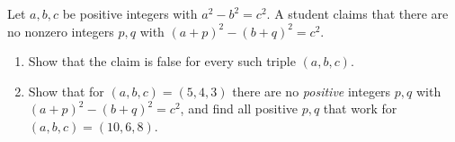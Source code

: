 Let $a,b,c$ be positive integers with $a^2-b^2=c^2$. A student claims that there are no nonzero integers $p,q$ with $(a+p)^2-(b+q)^2=c^2$.
\begin{enumerate}
\item[(a)] Show that the claim is false for every such triple $(a,b,c)$.
\item[(b)] Show that for $(a,b,c)=(5,4,3)$ there are no \emph{positive} integers $p,q$ with $(a+p)^2-(b+q)^2=c^2$, and find all positive $p,q$ that work for $(a,b,c)=(10,6,8)$.
\end{enumerate}
